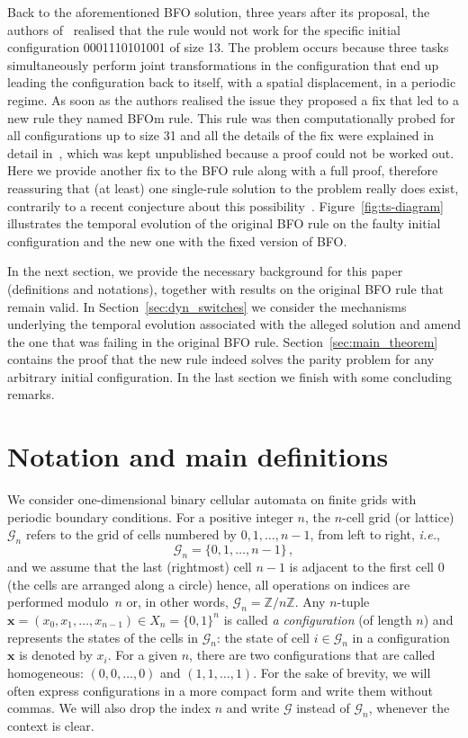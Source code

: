 \documentclass{sn-jnl}
\newcommand{\bx}{\mathbf{x}}
\newcommand{\G}{\mathcal{G} }
\newcommand{\Z}{\mathbb{Z}}
\begin{document}
Back to the aforementioned BFO solution, three years after its proposal, the authors of~\cite{BFO2013} realised that the rule would not work for the specific initial configuration 0001110101001 of size 13. The problem occurs because three tasks simultaneously perform joint transformations in the configuration that end up leading the configuration back to itself, with a spatial displacement, in a periodic regime.
As soon as the authors realised the issue they proposed a fix that led to a new rule they named BFOm rule. This rule was then computationally probed for all configurations up to size 31 and all the details of the fix were explained in detail in~\cite{BFOm2016}, which was kept unpublished because a proof could not be worked out. Here we provide another fix to the BFO rule along with a full proof, therefore reassuring that (at least) one single-rule solution to the problem really does exist, contrarily to a recent conjecture about this possibility~\cite{Celestine_2023}. Figure~\ref{fig:ts-diagram} illustrates the temporal evolution of the original BFO rule on the faulty initial configuration and the new one with the fixed version of BFO.

In the next section, we provide the necessary background for this paper (definitions and notations), together with results on the original BFO rule that remain valid. In Section~\ref{sec:dyn_switches} we consider the mechanisms underlying the temporal evolution associated with the alleged solution and amend the one that was failing in the original BFO rule. Section~\ref{sec:main_theorem} contains the proof that the new rule indeed solves the parity problem for any arbitrary initial configuration. In the last section we finish with some concluding remarks. 


\section{Notation and main definitions}
We consider one-dimensional binary cellular automata on finite grids with periodic boundary conditions. For a positive integer $n$, the $n$-cell grid (or lattice) $\G_n$ refers to the grid of cells numbered by $0,1,\ldots,n-1$, from left to right, \emph{i.e.}, 
\[
\G_n =\{0,1,\dots,n-1\}\,,
\]
and we assume that the last (rightmost) cell $n-1$ is adjacent to the first cell $0$ (the cells are arranged along a circle) hence, all operations on indices are performed modulo~$n$ or, in other words, $\G_n =\Z/n\Z$. Any $n$-tuple $\bx =(x_0,x_1,\ldots,x_{n-1})\in X_n = \{0,1\}^n$ is called \emph{a configuration} (of length $n$) and represents the states of the cells in $\G_n$: the state of cell $i\in \G_n$ in a configuration $\bx$ is denoted by $x_i$. For a given $n$, there are two configurations that are called homogeneous: $(0,0,\ldots,0)$ and $(1,1,\ldots,1)$. 
For the sake of brevity, we will often express configurations in a more compact form and write them without commas. We will also drop the index $n$ and write $\G$ instead of $\G_n$, whenever the context is clear.
\end{document}
